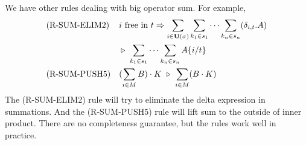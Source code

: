 \documentclass[runningheads]{llncs}
\begin{document}

We have other rules dealing with big operator sum. For example, 
\begin{align*}
    & \textrm{(R-SUM-ELIM2)}
    && i \text{ free in } t \Rightarrow \sum_{i \in \mathbf{U}(\sigma)} \sum_{k_1 \in s_1} \cdots \sum_{k_n \in s_n} (\delta_{i, t}.A) \\
    & && \triangleright\ \sum_{k_1 \in s_1} \cdots \sum_{k_n \in s_n} A\{i/t\} \\
    & \textrm{(R-SUM-PUSH5)}
    && (\sum_{i \in M} B)\cdot K \ \triangleright\ \sum_{i \in M}(B \cdot K)
\end{align*}
The (R-SUM-ELIM2) rule will try to eliminate the delta expression in summations.
And the (R-SUM-PUSH5) rule will lift sum to the outside of inner product.
There are no completeness guarantee, but the rules work well in practice.
\end{document}
